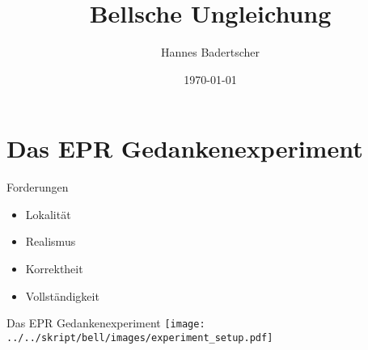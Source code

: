 \documentclass{beamer}
\author{Hannes Badertscher}
\title{Bellsche Ungleichung}
\date{\today}
\begin{document}
\maketitle

\begin{frame}
    \tableofcontents
\end{frame}

\section{Das EPR Gedankenexperiment}
\begin{frame}{Forderungen}
    \begin{itemize}
        \item Lokalit\"at
        \item Realismus
        \vspace{1cm}
        \item Korrektheit
        \item Vollst\"andigkeit
    \end{itemize}
\end{frame}
\begin{frame}{Das EPR Gedankenexperiment}
    \centering
    \texttt{[image: ../../skript/bell/images/experiment\_setup.pdf]}
\end{frame}
\end{document}
